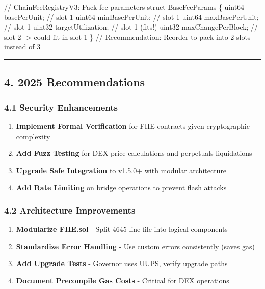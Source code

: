 \documentclass[
]{article}
\newenvironment{Shaded}{}{}
\newcommand{\NormalTok}[1]{#1}
\providecommand{\tightlist}{%
  \setlength{\itemsep}{0pt}\setlength{\parskip}{0pt}}
\begin{document}
\begin{Shaded}
\begin{Highlighting}[]
\NormalTok{// ChainFeeRegistryV3: Pack fee parameters}
\NormalTok{struct BaseFeeParams \{}
\NormalTok{    uint64 basePerUnit;           // slot 1}
\NormalTok{    uint64 minBasePerUnit;        // slot 1}
\NormalTok{    uint64 maxBasePerUnit;        // slot 1}
\NormalTok{    uint32 targetUtilization;     // slot 1 (fits!)}
\NormalTok{    uint32 maxChangePerBlock;     // slot 2 {-}\textgreater{} could fit in slot 1}
\NormalTok{\}}
\NormalTok{// Recommendation: Reorder to pack into 2 slots instead of 3}
\end{Highlighting}
\end{Shaded}

\begin{center}\rule{0.5\linewidth}{0.5pt}\end{center}

\subsection{4. 2025 Recommendations}\label{4-2025-recommendations}

\subsubsection{4.1 Security
Enhancements}\label{41-security-enhancements}

\begin{enumerate}
\def\labelenumi{\arabic{enumi}.}
\tightlist
\item
  \textbf{Implement Formal Verification} for FHE contracts given
  cryptographic complexity
\item
  \textbf{Add Fuzz Testing} for DEX price calculations and perpetuals
  liquidations
\item
  \textbf{Upgrade Safe Integration} to v1.5.0+ with modular architecture
\item
  \textbf{Add Rate Limiting} on bridge operations to prevent flash
  attacks
\end{enumerate}

\subsubsection{4.2 Architecture
Improvements}\label{42-architecture-improvements}

\begin{enumerate}
\def\labelenumi{\arabic{enumi}.}
\tightlist
\item
  \textbf{Modularize FHE.sol} - Split 4645-line file into logical
  components
\item
  \textbf{Standardize Error Handling} - Use custom errors consistently
  (saves gas)
\item
  \textbf{Add Upgrade Tests} - Governor uses UUPS, verify upgrade paths
\item
  \textbf{Document Precompile Gas Costs} - Critical for DEX operations
\end{enumerate}
\end{document}
